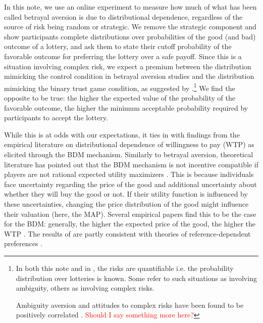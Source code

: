 In this note, we use an online experiment to measure how much of what has been called betrayal aversion is due to distributional dependence, regardless of the source of risk being random or strategic.
We remove the strategic component and show participants complete distributions over probabilities of the good (and bad) outcome of a lottery, and ask them to state their cutoff probability of the favorable outcome for preferring the lottery over a safe payoff.
Since this is a situation involving complex risk, we expect a premium between the distribution mimicking the control condition in betrayal aversion studies and the distribution mimicking the binary trust game condition, as suggested by \cite{Li2020a}.\footnote{
In both this note and in \cite{Li2020a}, the risks are quantifiable i.e. the probability distribution over lotteries is known.
Some refer to such situations as involving ambiguity, others as involving complex risks.

Ambiguity aversion and attitudes to complex risks have been found to be positively correlated \citep{Armantier2016}.
\textcolor{red}{Should I say something more here?}
}
We find the opposite to be true: the higher the expected value of the probability of the favorable outcome, the higher the minimum acceptable probability required by participants to accept the lottery.

While this is at odds with our expectations, it ties in with findings from the empirical literature on distributional dependence of willingness to pay (WTP) as elicited through the BDM mechanism.
Similarly to betrayal aversion, theoretical literature has pointed out that the BDM mechanism is not incentive compatible if players are not rational expected utility maximizers \citep{Karni1987,Horowitz2006}.
This is because individuals face uncertainty regarding the price of the good and additional uncertainty about whether they will buy the good or not.
If their utility function is influenced by these uncertainties, changing the price distribution of the good might influence their valuation (here, the MAP).
Several empirical papers find this to be the case for the BDM: generally, the higher the expected price of the good, the higher the WTP \citep[for a short review of this literature, see][]{Tymula2016}.
The results of \cite{Tymula2016} are partly consistent with theories of reference-dependent preferences \citep{Koszegi2006, Koszegi2007, Wenner2015}.

